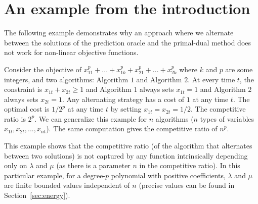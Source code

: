 
\section{An example from the introduction} \label{apix:example-introduction}

The following example demonstrates why an approach where we alternate between the solutions of the prediction oracle and the primal-dual method does not work for non-linear objective functions.

Consider the objective of $x_{11}^p + ... + x_{1k}^p + x_{21}^p + ... + x_{2k}^p$ where $k$ and $p$ are some integers, and two algorithms: Algorithm $1$ and Algorithm $2$. At every time $t$, the constraint is $x_{1t} + x_{2t} \geq 1$ and Algorithm $1$ always sets $x_{1t} = 1$ and Algorithm $2$ always sets $x_{2t} = 1$. Any alternating strategy has a cost of $1$ at any time $t$. The optimal cost is $1/2^p$ at any time $t$ by setting $x_{1t} = x_{2t} = 1/2$. The competitive ratio is $2^p$. We can generalize this example for $n$ algorithms ($n$ types of variables $x_{1t}, x_{2t}, ..., x_{nt}$). The same computation gives the competitive ratio of $n^p$.

This example shows that the competitive ratio (of the algorithm that alternates between two solutions) is not captured by any function intrinsically depending only on $\lambda$ and $\mu$ (as there is a parameter $n$ in the competitive ratio). In this particular example, for a degree-$p$ polynomial with positive coefficients, $\lambda$ and $\mu$ are finite bounded values independent of $n$ (precise values can be found in Section~\ref{sec:energy}).

\clearpage


